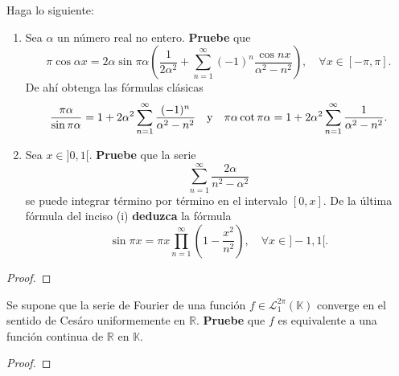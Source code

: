 \documentclass[12pt]{report}
\theoremstyle{largebreak}
\begin{document}
    \begin{excer}
        Haga lo siguiente:
        \begin{enumerate}
            \item Sea $\alpha$ un número real no entero. \textbf{Pruebe} que
            \begin{equation*}
                \pi\cos\alpha x=2\alpha\sin\pi\alpha\left(\frac{1}{2\alpha^2}+\sum_{ n=1}^\infty(-1)^n\frac{\cos nx}{\alpha^2-n^2} \right),\quad\forall x\in[-\pi,\pi].
            \end{equation*}
            De ahí obtenga las fórmulas clásicas
            \begin{equation*}
                \frac{\pi\alpha}{\sin\pi\alpha}=1+2\alpha^2\sum_{ n=1}^\infty\frac{(-1)^n}{\alpha^2-n^2}\quad\textup{y}\quad\pi\alpha\cot\pi\alpha=1+2\alpha^2\sum_{ n=1}^\infty\frac{1}{\alpha^2-n^2}.
            \end{equation*}
            \item Sea $x\in]0,1[$. \textbf{Pruebe} que la serie
            \begin{equation*}
                \sum_{ n=1}^\infty\frac{2\alpha}{n^2-\alpha^2}
            \end{equation*}
            se puede integrar término por término en el intervalo $[0,x]$. De la última fórmula del inciso (i) \textbf{deduzca} la fórmula
            \begin{equation*}
                \sin\pi x=\pi x\prod_{ n=1}^\infty\left(1-\frac{x^2}{n^2} \right),\quad\forall x\in]-1,1[.
            \end{equation*}
        \end{enumerate}
    \end{excer}

    \begin{proof}
        
    \end{proof}

    \begin{excer}
        Se supone que la serie de Fourier de una función $f\in\mathcal{L}_1^{2\pi}(\mathbb{K})$ converge en el sentido de Cesáro uniformemente en $\mathbb{R}$. \textbf{Pruebe} que $f$ es equivalente a una función continua de $\mathbb{R}$ en $\mathbb{K}$.
    \end{excer}

    \begin{proof}
        
    \end{proof}
\end{document}
